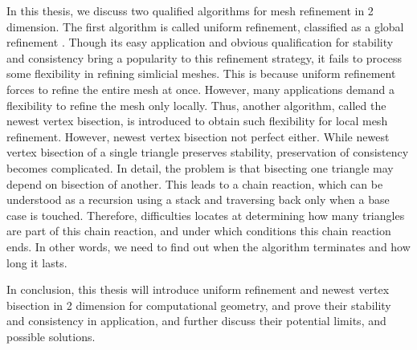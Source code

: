 In this thesis, we discuss two qualified algorithms for mesh refinement in 2 dimension. The first algorithm is called uniform refinement, classified as a global refinement \cite{bank1983some,bey2000simplicial,Bey1995}. Though its easy application and obvious qualification for stability and consistency bring a popularity to this refinement strategy, it fails to process some flexibility in refining simlicial meshes. This is because uniform refinement forces to refine the entire mesh at once. However, many applications demand a flexibility to refine the mesh only locally. Thus, another algorithm, called the newest vertex bisection, is introduced to obtain such flexibility for local mesh refinement. However, newest vertex bisection not perfect either. While newest vertex bisection of a single triangle preserves stability, preservation of consistency becomes complicated. In detail, the problem is that bisecting one triangle may depend on bisection of another. This leads to a chain reaction, which can be understood as a recursion using a stack and traversing back only when a base case is touched. Therefore, difficulties locates at determining how many triangles are part of this chain reaction, and under which conditions this chain reaction ends. In other words, we need to find out when the algorithm terminates and how long it lasts. 

In conclusion, this thesis will introduce uniform refinement and newest vertex bisection in 2 dimension for computational geometry, and prove their stability and consistency in application, and further discuss their potential limits, and possible solutions.